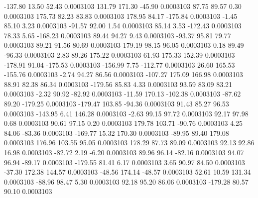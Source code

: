      -137.80       13.50       52.43     0.0003103
      131.79      171.30      -45.90     0.0003103
       87.75       89.57        0.30     0.0003103
      175.73       82.23       83.83     0.0003103
      178.95       84.17     -175.84     0.0003103
       -1.45       85.10        3.23     0.0003103
      -91.57       92.00        1.54     0.0003103
       85.14        3.53     -172.43     0.0003103
       78.33        5.65     -168.23     0.0003103
       89.44       94.27        9.43     0.0003103
      -93.37       95.81       79.77     0.0003103
       89.21       91.56       80.69     0.0003103
      179.19       98.15       96.05     0.0003103
        0.18       89.49      -96.33     0.0003103
        2.83       89.26      175.22     0.0003103
       61.93      175.33      152.39     0.0003103
     -178.91       91.04     -175.53     0.0003103
     -156.99        7.75     -112.77     0.0003103
       26.60      165.53     -155.76     0.0003103
       -2.74       94.27       86.56     0.0003103
     -107.27      175.09      166.98     0.0003103
       88.91       82.38       86.34     0.0003103
     -179.56       85.83        4.33     0.0003103
       93.59       83.09       83.21     0.0003103
       -2.32       90.92      -82.92     0.0003103
      -11.59      170.13     -102.38     0.0003103
      -87.62       89.20     -179.25     0.0003103
     -179.47      103.85      -94.36     0.0003103
       91.43       85.27       96.53     0.0003103
     -143.95        6.41      146.28     0.0003103
       -2.63       99.15       97.72     0.0003103
       92.17       97.98        0.68     0.0003103
       90.61       97.15        0.20     0.0003103
      179.78      103.71      -90.76     0.0003103
        4.25       84.06      -83.36     0.0003103
     -169.77       15.32      170.30     0.0003103
      -89.95       89.40      179.08     0.0003103
      176.96      103.55       95.05     0.0003103
      178.29       87.73       89.09     0.0003103
       92.13       92.86       16.98     0.0003103
      -82.72        2.19       -6.20     0.0003103
       89.96       96.14      -82.16     0.0003103
       94.07       96.94      -89.17     0.0003103
     -179.55       81.41        6.17     0.0003103
        3.65       90.97       84.50     0.0003103
      -37.30      172.38      144.57     0.0003103
      -48.56      174.14      -48.57     0.0003103
       52.61       10.59      131.34     0.0003103
      -88.96       98.47        5.30     0.0003103
       92.18       95.20       86.06     0.0003103
     -179.28       80.57       90.10     0.0003103
